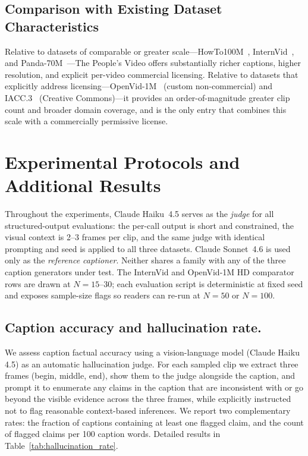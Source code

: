 \documentclass{article}
\begin{document}
\subsection{Comparison with Existing Dataset Characteristics}

Relative to datasets of comparable or greater scale---HowTo100M~\cite{miech2019howto100m}, InternVid~\cite{wang2024internvid}, and Panda-70M~\cite{chen2024panda70m}---The People's Video offers substantially richer captions, higher resolution, and explicit per-video commercial licensing. Relative to datasets that explicitly address licensing---OpenVid-1M~\cite{nan2024openvid} (custom non-commercial) and IACC.3~\cite{awad2022iacc3} (Creative Commons)---it provides an order-of-magnitude greater clip count and broader domain coverage, and is the only entry that combines this scale with a commercially permissive license.

\section{Experimental Protocols and Additional Results}
\label{app:experiments}

Throughout the experiments, Claude Haiku~4.5 serves as the \emph{judge} for all structured-output evaluations: the per-call output is short and constrained, the visual context is 2--3 frames per clip, and the same judge with identical prompting and seed is applied to all three datasets. Claude Sonnet~4.6 is used only as the \emph{reference captioner}. Neither shares a family with any of the three caption generators under test. The InternVid and OpenVid-1M HD comparator rows are drawn at $N = 15$--$30$; each evaluation script is deterministic at fixed seed and exposes sample-size flags so readers can re-run at $N = 50$ or $N = 100$.

\subsection{Caption accuracy and hallucination rate.}

We assess caption factual accuracy using a vision-language model (Claude Haiku 4.5) as an automatic hallucination judge. For each sampled clip we extract three frames (begin, middle, end), show them to the judge alongside the caption, and prompt it to enumerate any claims in the caption that are inconsistent with or go beyond the visible evidence across the three frames, while explicitly instructed not to flag reasonable context-based inferences. We report two complementary rates: the fraction of captions containing at least one flagged claim, and the count of flagged claims per 100 caption words. Detailed results in Table~\ref{tab:hallucination_rate}.
\end{document}
